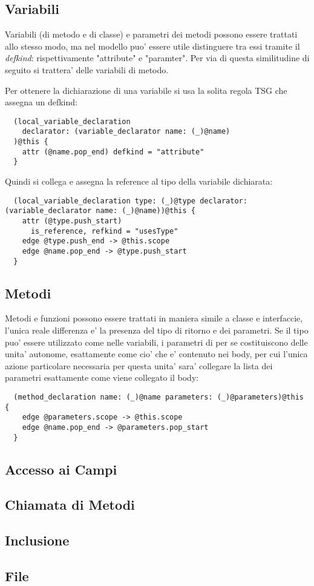 \subsection{Variabili}

Variabili (di metodo e di classe) e parametri dei metodi possono essere trattati allo stesso modo, ma nel modello puo' essere utile distinguere tra essi tramite il \emph{defkind}: rispettivamente "attribute" e "paramter".
Per via di questa similitudine di seguito si trattera' delle variabili di metodo.

Per ottenere la dichiarazione di una variabile si usa la solita regola TSG che assegna un defkind:

\begin{lstlisting}
  (local_variable_declaration
    declarator: (variable_declarator name: (_)@name)
  )@this {
    attr (@name.pop_end) defkind = "attribute"
  }
\end{lstlisting}

Quindi si collega e assegna la reference al tipo della variabile dichiarata:

\begin{lstlisting}
  (local_variable_declaration type: (_)@type declarator: (variable_declarator name: (_)@name))@this {
    attr (@type.push_start)
      is_reference, refkind = "usesType"
    edge @type.push_end -> @this.scope
    edge @name.pop_end -> @type.push_start
  }
\end{lstlisting}

\subsection{Metodi}

Metodi e funzioni possono essere trattati in maniera simile a classe e interfaccie, l'unica reale differenza e' la presenza del tipo di ritorno e dei parametri.
Se il tipo puo' essere utilizzato come nelle variabili, i parametri di per se costituiscono delle unita' autonome, esattamente come cio' che e' contenuto nei body, per cui l'unica azione particolare necessaria per questa unita' sara' collegare la lista dei parametri esattamente come viene collegato il body:

\begin{lstlisting}
  (method_declaration name: (_)@name parameters: (_)@parameters)@this {
    edge @parameters.scope -> @this.scope
    edge @name.pop_end -> @parameters.pop_start
  }
\end{lstlisting}

\subsection{Accesso ai Campi}

\subsection{Chiamata di Metodi}

\subsection{Inclusione}

\subsection{File}
